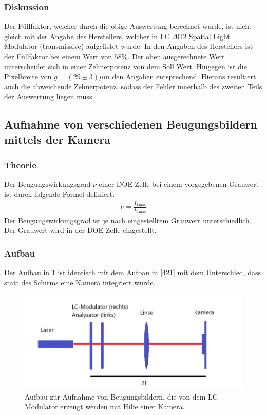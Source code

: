 \subsubsection{Diskussion}
Der Füllfaktor, welcher durch die obige Auswertung berechnet wurde, ist nicht gleich mit der Angabe des Herstellers, welcher in LC 2012 Spatial Light Modulator (transmissive) aufgelistet wurde. In den Angaben des Herstellers ist der Füllfaktor bei einem Wert von $58 \%$. Der oben ausgerechnete Wert unterscheidet sich in einer Zehnerpotenz von dem Soll Wert. Hingegen ist die Pixelbreite von $g = (29 \pm 3) \mu m$ den Angaben entsprechend. Hieraus resultiert auch die abweichende Zehnerpotenz, sodass der Fehler innerhalb des zweiten Teils der Auswertung liegen muss.

\subsection{Aufnahme von verschiedenen Beugungsbildern mittels der Kamera}
\subsubsection{Theorie}
Der Beugungswirkungsgrad $\nu$ einer DOE-Zelle bei einem vorgegebenen Grauwert ist durch folgende Formel definiert.
\begin{align}
	\nu = \frac{I_\text{1,max}}{I_\text{0,max}}
	\label{fff}
\end{align}
Der Beugungswirkungsgrad ist je nach eingestelltem Grauwert unterschiedlich. Der Grauwert wird in der DOE-Zelle eingestellt.
\subsubsection{Aufbau}
Der Aufbau in \cref{423} ist identisch mit dem Aufbau in \cref{421} mit dem Unterschied, dass statt des Schirms eine Kamera integriert wurde.
\begin{figure}[h!]
	\centering
	\includegraphics[scale = 1]{Kamera111.png}
	\caption{Aufbau zur Aufnahme von Beugungsbildern, die von dem LC-Modulator erzeugt werden mit Hilfe einer Kamera.}
	\label{423}
\end{figure}
